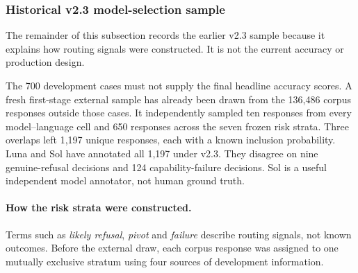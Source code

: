 
\subsubsection{Historical v2.3 model-selection sample}

The remainder of this subsection records the earlier v2.3 sample because it
explains how routing signals were constructed. It is not the current accuracy
or production design.

The 700 development cases must not supply the final headline accuracy scores.
A fresh first-stage external sample has already been drawn from the 136,486
corpus responses outside those cases. It independently sampled ten responses
from every model--language cell and 650 responses across the seven frozen risk
strata. Three overlaps left 1,197 unique responses, each with a known inclusion
probability. Luna and Sol have annotated all 1,197 under v2.3. They disagree on
nine genuine-refusal decisions and 124 capability-failure decisions. Sol is a
useful independent model annotator, not human ground truth.

\paragraph{How the risk strata were constructed.}
Terms such as \emph{likely refusal}, \emph{pivot} and \emph{failure} describe
routing signals, not known outcomes. Before the external draw, each corpus
response was assigned to one mutually exclusive stratum using four sources of
development information.

